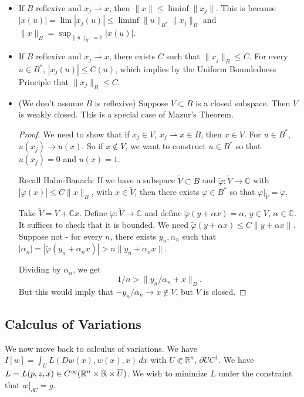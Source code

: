 \documentclass[12pt]{scrartcl}
\newcommand{\R}{\mathbb{R}}
\newcommand{\C}{\mathbb C}
\newcommand{\<}{\langle}
\renewcommand{\>}{\rangle}
\let \phi \varphi
\let \weakto \rightharpoonup
\begin{document}
\begin{itemize}
\item If $B$ reflexive and $x_j \weakto x$, then $\|x\| \le \liminf \|x_j\|$.  This is because $|x(u)| = \lim |x_j(u)| \le \liminf \|u\|_{B^*} \|x_j\|_B$ and $\|x\|_B = \sup_{\|u\|_{B^*} = 1} |x(u)|$.
\item If $B$ reflexive and $x_j\weakto x$, there exists $C$ such that $\|x_j\|_B \le C$.  For every $u \in B^*$, $|x_j(u)| \le C(u)$, which implies by the Uniform Boundedness Principle that $\|x_j\|_B \le C$.
\item (We don't assume $B$ is reflexive) Suppose $V \subset B$ is a closed subspace.  Then $V$ is weakly closed.  This is a special case of Mazur's Theorem.  
\begin{proof}
We need to show that if $x_j \in V$, $x_j \weakto x \in B$, then $x \in V$.  For $u \in B^*$, $u(x_j) \to u(x)$.  So if $x \not \in V$, we want to construct $u \in B^*$ so that $u(x_j) = 0$ and $u(x) = 1$.  

Recall Hahn-Banach:  If we have a subspace $\tilde V \subset B$ and $\tilde{\phi} : \tilde V \to \C$ with $|\tilde{\phi}(x)| \le C \|x\|_B$, with $x \in \tilde V$, then there exists $\phi \in B^*$ so that $\phi\vert_{\tilde{V}} = \tilde{\phi}$.

Take $\tilde{V} = V + \C x$.  Define $\tilde{\phi}: \tilde{V} \to \C$ and define $\tilde{\phi}(y + \alpha x) = \alpha$, $y \in V$, $\alpha \in \C$.  It suffices to check that it is bounded.  We need $\tilde{\phi}(y + \alpha x) \le C\|y + \alpha x\|$.  Suppose not - for every $n$, there exists $y_n, \alpha_n$ such that $ |\alpha _n|= |\tilde{\phi}(y_n + \alpha_n x)| > n \|y_n + \alpha_n x\|$.  

Dividing by $\alpha_n$, we get 
$$1/n > \| y_n/\alpha_n + x\|_B.$$
But this would imply that $-y_n/\alpha_n \to x \not \in V$, but $V$ is closed.  

\end{proof}
\end{itemize}
\subsection{Calculus of Variations}
We now move back to calculus of variations.  We have $I[w] = \int_U L(Dw(x), w(x), x)\,dx$ with $U \Subset \R^n$, $\partial U C^1$.  We have $L = L(p, z, x) \in C^\infty(\R^n \times \R \times \ol{U})$.  We wish to minimize $L$ under the constraint that $w \vert_{\partial U} = g$.
\end{document}
